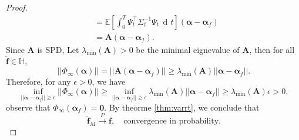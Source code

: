 \documentclass[11pt]{article} %
\def\vzero{{\bm{0}}}
\def\vf{{\bm{f}}}
\def\mA{{\bm{A}}}
\def\sH{{\mathbb{H}}}
\newcommand{\E}{\mathbb{E}}
\DeclareMathOperator{\dif}{d \!}        %
\newcommand{\dt}{\dif t}
\newcommand{\alphavec}{\bm\alpha}
\newcommand{\norm}[1]{||#1||}
\begin{document}
\begin{proof}
\[\begin{aligned}
&= \E[\int_0^T \Psi_t^\intercal\Sigma_t^{-1}\Psi_t\, \dt](\alphavec - \alphavec_f)\, \\
&= \mA(\alphavec - \alphavec_f).
\end{aligned}
\]
Since $\mA$ is SPD, Let $\lambda_{\min}(\mA) > 0$ be the minimal eignevalue of $\mA$, then for all $\tilde\vf \in \sH$, 
\[
\norm{\Phi_{\infty}(\alphavec)} = \norm{\mA(\alphavec - \alphavec_f)} \ge \lambda_{\min}(\mA)\norm{\alphavec - \alphavec_f}.
\]
Therefore, for any $\epsilon > 0$, we have
\[
\inf_{\norm{\alphavec - \alphavec_f} \ge \epsilon}\norm{\Phi_{\infty}(\alphavec)} \ge \inf_{\norm{\alphavec - \alphavec_f} \ge \epsilon}\lambda_{\min}(\mA)\norm{\alphavec - \alphavec_f} \ge \lambda_{\min}(\mA)\epsilon > 0, 
\]
observe that $\Phi_{\infty}(\alphavec_f) = \vzero$.  By theorme \ref{thm:varrt}, we conclude that
\[
\hat\vf_M \xrightarrow{P} \vf, \quad \text{convergence in probability}. 
\]


\end{proof}
\end{document}
